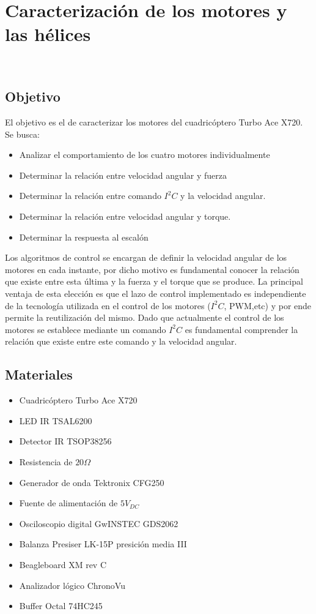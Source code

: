 \documentclass[main]{subfiles}
\begin{document}
\chapter{Caracterizaci\'on de los motores y las h\'elices}\
\label{chap:test_motores}
\section{Objetivo}
El objetivo es el de caracterizar los motores del cuadric\'optero Turbo Ace X720. Se busca:

\begin{itemize}
\item Analizar el comportamiento de los cuatro motores individualmente
\item Determinar la relaci\'on entre velocidad angular y fuerza
\item Determinar la relaci\'on entre comando $I^2C$ y la velocidad angular.
\item Determinar la relaci\'on entre velocidad angular y torque.
\item Determinar la respuesta al escal\'on
\end{itemize}

Los algoritmos de control se encargan de definir la velocidad angular de los motores en cada instante, por dicho motivo es fundamental conocer la relaci\'on que existe entre esta \'ultima y la fuerza y el torque que se produce. La principal ventaja de esta elecci\'on es que el lazo de control implementado es independiente de la tecnolog\'ia utilizada en el control de los motores ($I^2C$, PWM,etc) y por ende permite la reutilizaci\'on del mismo. Dado que actualmente el control de los motores se establece mediante un comando $I^2C$ es fundamental comprender la relaci\'on que existe entre este comando y la velocidad angular.

\section{Materiales}
\begin{itemize}
\item Cuadric\'optero Turbo Ace X720	
\item LED IR TSAL6200
\item Detector IR TSOP38256
\item Resistencia de $20 \Omega$
\item Generador de onda Tektronix CFG250
\item Fuente de alimentaci\'on de $5V_{DC}$
\item Osciloscopio digital GwINSTEC GDS2062
\item Balanza Presiser LK-15P presici\'on media III
\item Beagleboard XM rev C
\item Analizador l\'ogico ChronoVu
\item Buffer Octal 74HC245
\end{itemize}
\end{document}

